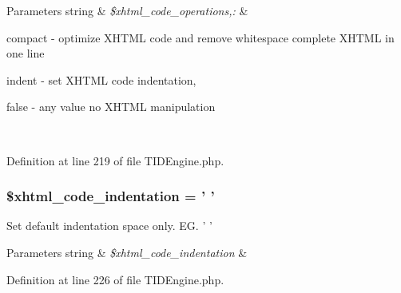 \begin{DoxyParams}[1]{Parameters}
string & {\em \$xhtml\_\-code\_\-operations,:} & 
\begin{DoxyItemize}
\item compact -\/ optimize XHTML code and remove whitespace complete XHTML in one line
\item indent -\/ set XHTML code indentation,
\item false -\/ any value no XHTML manipulation 
\end{DoxyItemize}\\
\hline
\end{DoxyParams}


Definition at line 219 of file TIDEngine.php.

\hypertarget{group__xhtml__cache__settings_ga2395c8c084b383c7fa248df50b624e9a}{
\subsubsection[{\$xhtml\_\-code\_\-indentation}]{\setlength{\rightskip}{0pt plus 5cm}\$xhtml\_\-code\_\-indentation = ' '}}
\label{group__xhtml__cache__settings_ga2395c8c084b383c7fa248df50b624e9a}
Set default indentation space only. EG. ' '


\begin{DoxyParams}[1]{Parameters}
string & {\em \$xhtml\_\-code\_\-indentation} & \\
\hline
\end{DoxyParams}


Definition at line 226 of file TIDEngine.php.

